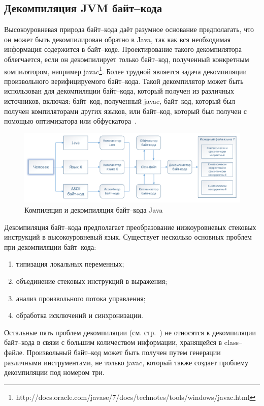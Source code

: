 \subsection{Декомпиляция JVM байт--кода}
Высокоуровневая природа байт--кода даёт разумное основание предполагать, что он может быть декомпилирован обратно в Java, так как вся необходимая информация содержится в байт--коде. Проектирование такого декомпилятора облегчается, если он декомпилирует только байт--код, полученный конкретным компилятором, например javac\footnote{http://docs.oracle.com/javase/7/docs/technotes/tools/windows/javac.html}. Более трудной является задача декомпиляции произвольного верифицируемого байт--кода. Такой декомпилятор может быть использован для декомпиляции байт--кода, который получен из различных источников, включая: байт--код, полученный javac,  байт--код, который был получен компиляторами других языков, или байт--код, который был получен с помощью оптимизатора или обфускатора~\cite{bytecode}.

\begin{figure}[H]
\includegraphics[width=1\linewidth]{Zabransky/c_d.pdf}
\caption{Компиляция и декомпиляция байт--кода Java}
\end{figure}


Декомпиляция байт--кода предполагает преобразование низкоуровневых стековых инструкций в высокоуровневый язык. Существует несколько основных проблем при декомпиляции байт--кода:

\begin{enumerate}
\item типизация локальных переменных;
\item объединение стековых инструкций в выражения;
\item анализ произвольного потока управления;
\item обработка исключений и синхронизации.
\end{enumerate}

Остальные пять проблем декомпиляции (см. стр.~\pageref{deproblems}) не относятся к декомпиляции байт--кода в связи с большим количеством информации, хранящейся в class--файле. Произвольный байт--код может быть получен путем генерации различными инструментами, не только javac, который также создает проблему декомпиляции под номером три.

